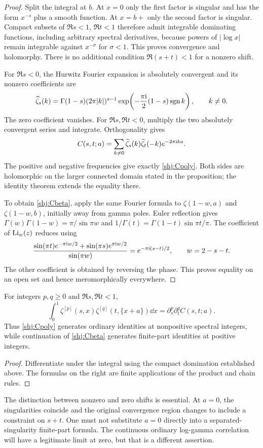 \begin{proof}
Split the integral at $b$. At $x=0$ only the first factor is singular and has the form $x^{-s}$ plus a smooth function. At $x=b+$ only the second factor is singular. Compact subsets of $\Re s<1$, $\Re t<1$ therefore admit integrable dominating functions, including arbitrary spectral derivatives, because powers of $|\log x|$ remain integrable against $x^{-\sigma}$ for $\sigma<1$. This proves convergence and holomorphy. There is no additional condition $\Re(s+t)<1$ for a nonzero shift.

For $\Re s<0$, the Hurwitz Fourier expansion \cite[Eq.~25.11.9]{intdist:DLMFHurwitz} is absolutely convergent and its nonzero coefficients are
\begin{equation}\label{shj:fouriercoef}
\widehat\zeta_s(k)=\Gamma(1-s)(2\pi|k|)^{s-1}
\exp\!\left(-\frac{\pi\mathrm{i}}{2}(1-s)\operatorname{sgn} k\right),\qquad k\ne0.
\end{equation}
The zero coefficient vanishes. For $\Re s,\Re t<0$, multiply the two absolutely convergent series and integrate. Orthogonality gives
\[
C(s,t;a)=\sum_{k\ne0}\widehat\zeta_s(k)\widehat\zeta_t(-k)e^{-2\pi\mathrm{i} ka}.
\]
The positive and negative frequencies give exactly \eqref{shj:Cpoly}. Both sides are holomorphic on the larger connected domain stated in the proposition; the identity theorem extends the equality there.

To obtain \eqref{shj:Cbeta}, apply the same Fourier formula to $\zeta(1-w,a)$ and $\zeta(1-w,b)$, initially away from gamma poles. Euler reflection gives
$\Gamma(w)\Gamma(1-w)=\pi/\sin\pi w$ and
$1/\Gamma(t)=\Gamma(1-t)\sin\pi t/\pi$.
The coefficient of $\operatorname{Li}_w(z)$ reduces using
\[
\frac{\sin(\pi t)e^{-\pi\mathrm{i} w/2}+\sin(\pi s)e^{\pi\mathrm{i} w/2}}
{\sin(\pi w)}=e^{-\pi\mathrm{i}(s-t)/2},\qquad w=2-s-t.
\]
The other coefficient is obtained by reversing the phase. This proves equality on an open set and hence meromorphically everywhere.
\end{proof}

\begin{corollary}\label{shj:ordinaryjets}
For integers $p,q\ge0$ and $\Re s,\Re t<1$,
\[
\int_0^1\zeta^{[p]}(s,x)\zeta^{[q]}(t,\{x+a\})\dd x
=\partial_s^p\partial_t^q C(s,t;a).
\]
Thus \eqref{shj:Cpoly} generates ordinary identities at nonpositive spectral integers, while continuation of \eqref{shj:Cbeta} generates finite-part identities at positive integers.
\end{corollary}
\begin{proof}
Differentiate under the integral using the compact domination established above. The formulas on the right are finite applications of the product and chain rules.
\end{proof}
The distinction between nonzero and zero shifts is essential. At $a=0$, the singularities coincide and the original convergence region changes to include a constraint on $s+t$. One must not substitute $a=0$ directly into a separated-singularity finite-part formula. The continuous ordinary log-gamma correlation will have a legitimate limit at zero, but that is a different assertion.


